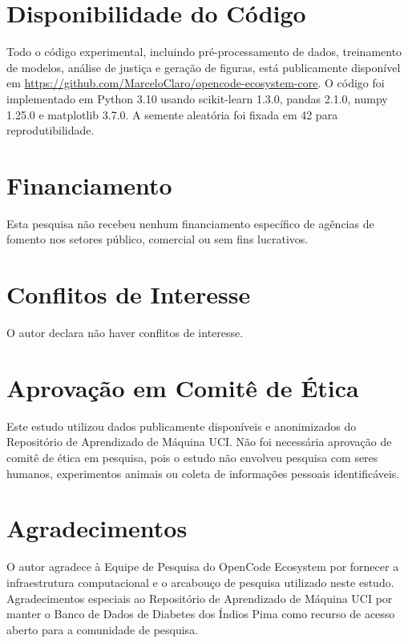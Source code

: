 \documentclass[12pt,a4paper]{article}
\begin{document}
\section*{Disponibilidade do Código}

Todo o código experimental, incluindo pré-processamento de dados, treinamento 
de modelos, análise de justiça e geração de figuras, está publicamente 
disponível em \url{https://github.com/MarceloClaro/opencode-ecosystem-core}. 
O código foi implementado em Python 3.10 usando scikit-learn 1.3.0, 
pandas 2.1.0, numpy 1.25.0 e matplotlib 3.7.0. A semente aleatória foi 
fixada em 42 para reprodutibilidade.

\section*{Financiamento}

Esta pesquisa não recebeu nenhum financiamento específico de agências de 
fomento nos setores público, comercial ou sem fins lucrativos.

\section*{Conflitos de Interesse}

O autor declara não haver conflitos de interesse.

\section*{Aprovação em Comitê de Ética}

Este estudo utilizou dados publicamente disponíveis e anonimizados do 
Repositório de Aprendizado de Máquina UCI. Não foi necessária aprovação 
de comitê de ética em pesquisa, pois o estudo não envolveu pesquisa com 
seres humanos, experimentos animais ou coleta de informações pessoais 
identificáveis.

\section*{Agradecimentos}

O autor agradece à Equipe de Pesquisa do OpenCode Ecosystem por fornecer 
a infraestrutura computacional e o arcabouço de pesquisa utilizado neste 
estudo. Agradecimentos especiais ao Repositório de Aprendizado de Máquina 
UCI por manter o Banco de Dados de Diabetes dos Índios Pima como recurso 
de acesso aberto para a comunidade de pesquisa.

\end{document}
